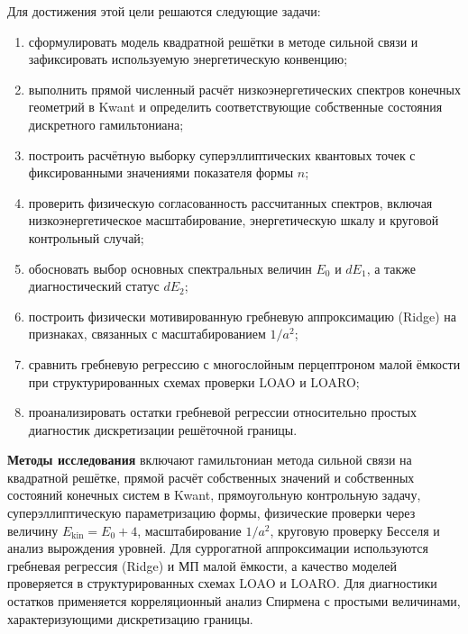 Для достижения этой цели решаются следующие задачи:
\begin{enumerate}
  \item сформулировать модель квадратной решётки в методе сильной связи и зафиксировать
  используемую энергетическую конвенцию;
  \item выполнить прямой численный расчёт низкоэнергетических спектров конечных геометрий
  в Kwant и определить соответствующие собственные состояния дискретного гамильтониана;
  \item построить расчётную выборку суперэллиптических квантовых точек с фиксированными
  значениями показателя формы $n$;
  \item проверить физическую согласованность рассчитанных спектров, включая
  низкоэнергетическое масштабирование, энергетическую шкалу и круговой контрольный случай;
  \item обосновать выбор основных спектральных величин $E_0$ и $dE_1$, а также
  диагностический статус $dE_2$;
  \item построить физически мотивированную гребневую аппроксимацию (Ridge) на признаках,
  связанных с масштабированием $1/a^2$;
  \item сравнить гребневую регрессию с многослойным перцептроном малой ёмкости при
  структурированных схемах проверки LOAO и LOARO;
  \item проанализировать остатки гребневой регрессии относительно простых диагностик
  дискретизации решёточной границы.
\end{enumerate}

\textbf{Методы исследования} включают гамильтониан метода сильной связи на квадратной
решётке, прямой расчёт собственных значений и собственных состояний конечных систем в
Kwant, прямоугольную контрольную задачу, суперэллиптическую параметризацию формы,
физические проверки через величину $E_{\mathrm{kin}}=E_0+4$, масштабирование $1/a^2$,
круговую проверку Бесселя и анализ вырождения уровней. Для суррогатной аппроксимации
используются гребневая регрессия (Ridge) и МП малой ёмкости, а качество моделей
проверяется в структурированных схемах LOAO и LOARO. Для диагностики остатков применяется
корреляционный анализ Спирмена с простыми величинами, характеризующими дискретизацию
границы.

